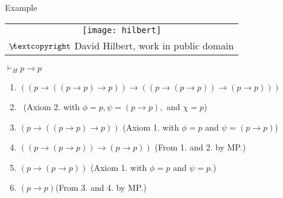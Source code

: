 \documentclass[../slides.tex]{subfiles}
\begin{document}
\begin{frame}{Example}

\begin{center}
		\begin{tabular}{c}
		\texttt{[image: hilbert]}\\[-1ex]
		{\tiny $\not\hspace{-1ex}\textcopyright$ David Hilbert, work in public domain}
		\end{tabular}
		\vspace{2ex}
		
		$\vdash_H p\to p$
		\end{center}
		
		
			\begin{enumerate}[1.] 

	\item $((p \to ((p \to p) \to p)) \to ((p \to (p \to p)) \to (p \to p)))$ 

	\item[] \ \hfill (Axiom 2. with $\phi=p, \psi=(p\to p),$ and $\chi=p$)

	\item $(p \to ((p \to p) \to p))$ \hfill (Axiom 1. with $\phi=p$ and $\psi=(p\to p)$)

	\item $((p \to (p \to p)) \to (p \to p))$ \hfill (From 1. and 2. by MP.)

	\item $(p \to (p \to p))$ \hfill (Axiom 1. with $\phi=p$ and $\psi=p$.)

	\item $(p \to p)$\hfill (From 3. and 4. by MP.)

\end{enumerate}

\end{frame}
\end{document}
